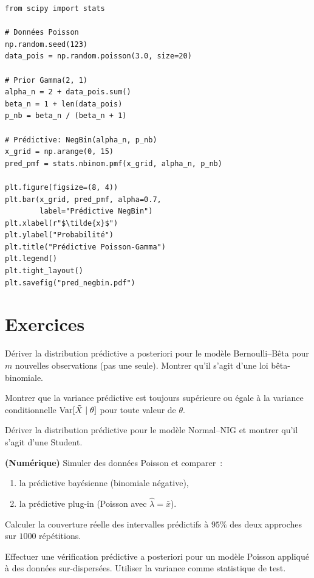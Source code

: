 \begin{codeblock}[title=\textbf{Pr\'edictive Poisson--Gamma (binomiale n\'egative)}]
\begin{verbatim}
from scipy import stats

# Données Poisson
np.random.seed(123)
data_pois = np.random.poisson(3.0, size=20)

# Prior Gamma(2, 1)
alpha_n = 2 + data_pois.sum()
beta_n = 1 + len(data_pois)
p_nb = beta_n / (beta_n + 1)

# Prédictive: NegBin(alpha_n, p_nb)
x_grid = np.arange(0, 15)
pred_pmf = stats.nbinom.pmf(x_grid, alpha_n, p_nb)

plt.figure(figsize=(8, 4))
plt.bar(x_grid, pred_pmf, alpha=0.7,
        label="Prédictive NegBin")
plt.xlabel(r"$\tilde{x}$")
plt.ylabel("Probabilité")
plt.title("Prédictive Poisson-Gamma")
plt.legend()
plt.tight_layout()
plt.savefig("pred_negbin.pdf")
\end{verbatim}
\end{codeblock}

\section{Exercices}

\begin{exercice}
D\'eriver la distribution pr\'edictive a posteriori pour le mod\`ele
Bernoulli--B\^eta pour $m$ nouvelles observations (pas une seule).
Montrer qu'il s'agit d'une loi b\^eta-binomiale.
\end{exercice}

\begin{exercice}
Montrer que la variance pr\'edictive est toujours sup\'erieure ou
\'egale \`a la variance conditionnelle $\mathrm{Var}[\tilde{X} \mid \theta]$
pour toute valeur de $\theta$.
\end{exercice}

\begin{exercice}
D\'eriver la distribution pr\'edictive pour le mod\`ele Normal--NIG et
montrer qu'il s'agit d'une Student.
\end{exercice}

\begin{exercice}
\textbf{(Num\'erique)} Simuler des donn\'ees Poisson et comparer~:
\begin{enumerate}
  \item la pr\'edictive bay\'esienne (binomiale n\'egative),
  \item la pr\'edictive plug-in (Poisson avec $\hat{\lambda} = \bar{x}$).
\end{enumerate}
Calculer la couverture r\'eelle des intervalles pr\'edictifs \`a $95\%$
des deux approches sur $1000$ r\'ep\'etitions.
\end{exercice}

\begin{exercice}
Effectuer une v\'erification pr\'edictive a posteriori pour un mod\`ele
Poisson appliqu\'e \`a des donn\'ees sur-dispers\'ees. Utiliser la
variance comme statistique de test.
\end{exercice}
